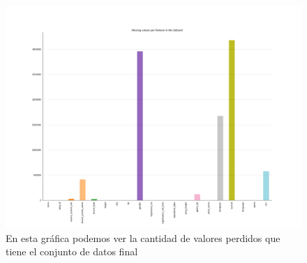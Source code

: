 \documentclass[a4paper]{article}
\begin{document}
\begin{figure}[H]
\centering
\includegraphics[width=1\textwidth]{Images/missings.png}
\caption{En esta gráfica podemos ver la cantidad de valores perdidos que tiene el conjunto de datos final}
\end{figure}
\end{document}
